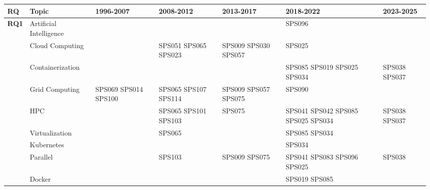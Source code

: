 \begin{table}
	{\renewcommand{\arraystretch}{1.3}
		\setlength{\tabcolsep}{4pt}
		\begin{tabular}{p{0.8cm}p{2.5cm}p{2.8cm}p{2.8cm}p{2.8cm}p{2.8cm}p{2.8cm}} \toprule
			\textbf{RQ}                    & \textbf{Topic}          & \textbf{1996-2007}   & \textbf{2008-2012}   & \textbf{2013-2017}   & \textbf{2018-2022}                 & \textbf{2023-2025} \\
			\midrule
			\multirow{12}{*}{\textbf{RQ1}} & Artificial Intelligence &                      &                      &                      & SPS096                             &                    \\
			                               & Cloud Computing         &                      & SPS051 SPS065 SPS023 & SPS009 SPS030 SPS057 & SPS025                             &                    \\
			                               & Containerization        &                      &                      &                      & SPS085 SPS019 SPS025 SPS034        & SPS038 SPS037      \\
			                               & Grid Computing          & SPS069 SPS014 SPS100 & SPS065 SPS107 SPS114 & SPS009 SPS057 SPS075 & SPS090                             &                    \\
			                               & HPC                     &                      & SPS065 SPS101 SPS103 & SPS075               & SPS041 SPS042 SPS085 SPS025 SPS034 & SPS038 SPS037      \\
			                               & Virtualization          &                      & SPS065               &                      & SPS085 SPS034                      &                    \\
			                               & Kubernetes              &                      &                      &                      & SPS034                             &                    \\
			                               & Parallel                &                      & SPS103               & SPS009 SPS075        & SPS041 SPS083 SPS096 SPS025        & SPS038             \\
			                               & Docker                  &                      &                      &                      & SPS019 SPS085                      &                    \\

\end{tabular}}
\end{table}
